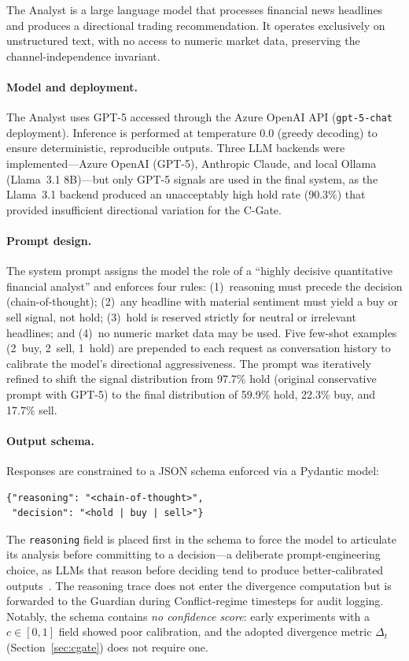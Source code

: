 The Analyst is a large language model that processes financial news
headlines and produces a directional trading recommendation. It operates
exclusively on unstructured text, with no access to numeric market data,
preserving the channel-independence invariant.

\paragraph{Model and deployment.}
The Analyst uses GPT-5 accessed through the Azure
OpenAI API (\texttt{gpt-5-chat} deployment). Inference is performed at
temperature $0.0$ (greedy decoding) to ensure deterministic, reproducible
outputs. Three LLM backends were implemented---Azure OpenAI (GPT-5),
Anthropic Claude, and local Ollama (Llama~3.1 8B)---but only GPT-5
signals are used in the final system, as the Llama~3.1 backend produced
an unacceptably high hold rate (90.3\%) that provided insufficient
directional variation for the C-Gate.

\paragraph{Prompt design.}
The system prompt assigns the model the role of a ``highly decisive
quantitative financial analyst'' and enforces four rules: (1)~reasoning
must precede the decision (chain-of-thought); (2)~any headline with
material sentiment must yield a buy or sell signal, not hold;
(3)~hold is reserved strictly for neutral or irrelevant headlines; and
(4)~no numeric market data may be used. Five few-shot examples
(2~buy, 2~sell, 1~hold) are prepended to each request as conversation
history to calibrate the model's directional aggressiveness. The prompt
was iteratively refined to shift the signal distribution from 97.7\%
hold (original conservative prompt with GPT-5) to the final distribution
of 59.9\% hold, 22.3\% buy, and 17.7\% sell.

\paragraph{Output schema.}
Responses are constrained to a JSON schema enforced via a Pydantic model:
\begin{verbatim}
{"reasoning": "<chain-of-thought>",
 "decision": "<hold | buy | sell>"}
\end{verbatim}
The \texttt{reasoning} field is placed first in the schema to force the
model to articulate its analysis before committing to a decision---a
deliberate prompt-engineering choice, as LLMs that reason before deciding
tend to produce better-calibrated outputs~\cite{wei2022chain}. The
reasoning trace does not enter the divergence computation but is forwarded
to the Guardian during Conflict-regime timesteps for audit logging.
Notably, the schema contains \emph{no confidence score}: early
experiments with a $c \in [0,1]$ field showed poor calibration, and the
adopted divergence metric $\Delta_t$ (Section~\ref{sec:cgate}) does not
require one.

